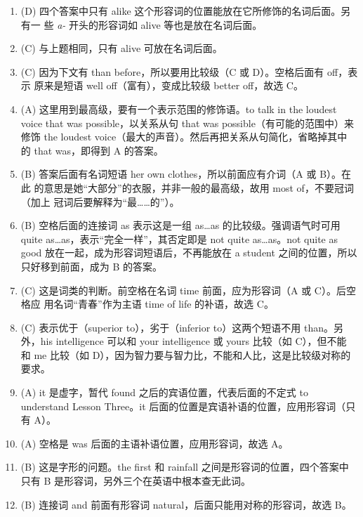 \begin{enumerate}
\item (D) 四个答案中只有 alike 这个形容词的位置能放在它所修饰的名词后面。另有一
  些 \emph{a-} 开头的形容词如 alive 等也是放在名词后面。
\item  (C) 与上题相同，只有 alive 可放在名词后面。
\item (C) 因为下文有 than before，所以要用比较级（C 或 D）。空格后面有 off，表示
  原来是短语 well off（富有），变成比较级 better off，故选 C。
\item (A) 这里用到最高级，要有一个表示范围的修饰语。to talk in the loudest
  voice that was possible，以关系从句 that was possible（有可能的范围中）来
  修饰 the loudest voice（最大的声音）。然后再把关系从句简化，省略掉其中
  的 that was，即得到 A 的答案。

\item (B) 答案后面有名词短语 her own clothes，所以前面应有介词（A 或 B）。在此
  的意思是她“大部分”的衣服，并非一般的最高级，故用 most of，不要冠词（加上
  冠词后要解释为“最……的”）。
\item (B) 空格后面的连接词 as 表示这是一组 as…as 的比较级。强调语气时可用 quite as…as，表示“完全一样”，其否定即是 not quite as…as。not quite as good 放在一起，成为形容词短语后，不再能放在 a student 之间的位置，所以只好移到前面，成为 B 的答案。

\item (C) 这是词类的判断。前空格在名词 time 前面，应为形容词（A 或 C）。后空格应
  用名词“青春”作为主语 time of life 的补语，故选 C。

\item (C) 表示优于（superior to），劣于（inferior to）这两个短语不用 than。另
  外，his intelligence 可以和 your intelligence 或 yours 比较（如 C），但不能
  和 me 比较（如 D），因为智力要与智力比，不能和人比，这是比较级对称的要求。

\item (A) it 是虚字，暂代 found 之后的宾语位置，代表后面的不定式 to understand Lesson Three。it 后面的位置是宾语补语的位置，应用形容词（只有 A）。
\item (A) 空格是 was 后面的主语补语位置，应用形容词，故选 A。

\item  (B) 这是字形的问题。the first 和 rainfall 之间是形容词的位置，四个答案中只有 B 是形容词，另外三个在英语中根本查无此词。

\item  (B) 连接词 and 前面有形容词 natural，后面只能用对称的形容词，故选 B。


\end{enumerate}
